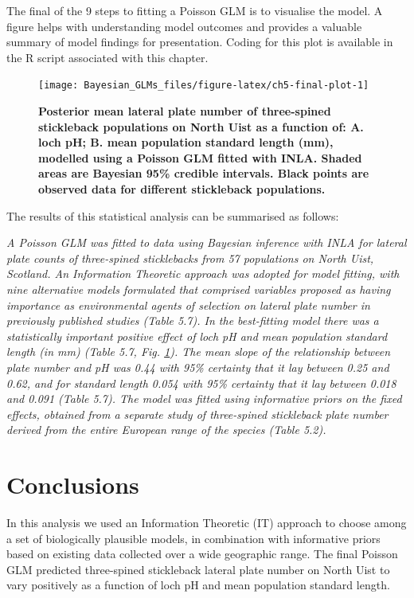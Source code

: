 \documentclass[
]{book}
\begin{document}
The final of the 9 steps to fitting a Poisson GLM is to visualise the model. A figure helps with understanding model outcomes and provides a valuable summary of model findings for presentation. Coding for this plot is available in the R script associated with this chapter.



\begin{figure}

{\centering \texttt{[image: Bayesian\_GLMs\_files/figure-latex/ch5-final-plot-1]} 

}

\caption{\textbf{Posterior mean lateral plate number of three-spined stickleback populations on North Uist as a function of: A. loch pH; B. mean population standard length (mm), modelled using a Poisson GLM fitted with INLA. Shaded areas are Bayesian 95\% credible intervals. Black points are observed data for different stickleback populations.}}\label{fig:ch5-final-plot}
\end{figure}

The results of this statistical analysis can be summarised as follows:

\emph{A Poisson GLM was fitted to data using Bayesian inference with INLA for lateral plate counts of three-spined sticklebacks from 57 populations on North Uist, Scotland. An Information Theoretic approach was adopted for model fitting, with nine alternative models formulated that comprised variables proposed as having importance as environmental agents of selection on lateral plate number in previously published studies (Table 5.7). In the best-fitting model there was a statistically important positive effect of loch pH and mean population standard length (in mm) (Table 5.7, Fig. \ref{fig:ch5-final-plot}). The mean slope of the relationship between plate number and pH was 0.44 with 95\% certainty that it lay between 0.25 and 0.62, and for standard length 0.054 with 95\% certainty that it lay between 0.018 and 0.091 (Table 5.7). The model was fitted using informative priors on the fixed effects, obtained from a separate study of three-spined stickleback plate number derived from the entire European range of the species (Table 5.2).}

\hypertarget{conclusions-2}{%
\section{Conclusions}\label{conclusions-2}}

In this analysis we used an Information Theoretic (IT) approach to choose among a set of biologically plausible models, in combination with informative priors based on existing data collected over a wide geographic range. The final Poisson GLM predicted three-spined stickleback lateral plate number on North Uist to vary positively as a function of loch pH and mean population standard length.
\end{document}

